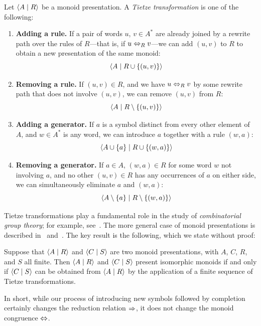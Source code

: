 \documentclass[../generics]{subfiles}
\begin{document}
\begin{definition}
Let $\langle A \mid R\rangle$ be a monoid presentation. A \emph{Tietze transformation} is one of the following:
\begin{enumerate}
\item \textbf{Adding a rule.} If a pair of words $u$, $v\in A^*$ are already joined by a rewrite path over the rules of $R$---that is, if $u\Leftrightarrow_R v$---we can add $(u,v)$ to $R$ to obtain a new presentation of the same monoid:
\[\langle A \mid R\cup\{(u,v)\}\rangle\]
\item \textbf{Removing a rule.} If $(u,v)\in R$, and we have $u \Leftrightarrow_R v$ by some rewrite path that does not involve $(u,v)$, we can remove $(u,v)$ from $R$:
\[\langle A \mid R\setminus\{(u,v)\}\rangle\]
\item \textbf{Adding a generator.} If $a$ is a symbol distinct from every other element of $A$, and $w\in A^*$ is any word, we can introduce $a$ together with a rule $(w,a)$:
\[\langle A\cup\{a\} \mid R\cup\{(w,a)\}\rangle\]
\item \textbf{Removing a generator.} If $a\in A$, $(w,a)\in R$ for some word $w$ not involving $a$, and no other $(u,v)\in R$ has any occurrences of $a$ on either side, we can simultaneously eliminate $a$ and $(w,a)$:
\[\langle A\setminus\{a\} \mid R\setminus\{(w,a)\}\rangle\]
\end{enumerate}
\end{definition}

Tietze transformations play a fundamental role in the study of \emph{combinatorial group theory}; for example, see~\cite{combinatorialgroup}. The more general case of monoid presentations is described in \cite{book2012string}~and~\cite{henry2021tietze}. The key result is the following, which we state without proof:

\begin{theorem}
Suppose that $\langle A \mid R\rangle$ and $\langle C \mid S\rangle$ are two monoid presentations, with $A$, $C$, $R$, and $S$ all finite. Then $\langle A \mid R\rangle$ and $\langle C \mid S\rangle$ present isomorphic monoids if and only if $\langle C \mid S\rangle$ can be obtained from $\langle A \mid R\rangle$ by the application of a finite sequence of Tietze transformations.
\end{theorem}

In short, while our process of introducing new symbols followed by completion certainly changes the reduction relation $\Rightarrow$, it does not change the monoid congruence $\Leftrightarrow$.
\end{document}
